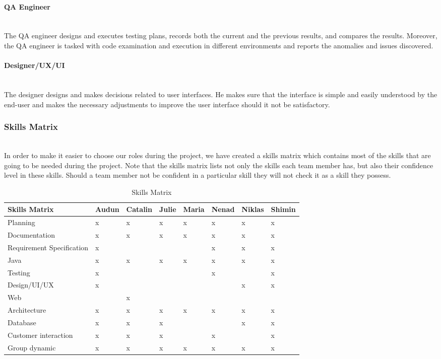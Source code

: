 \documentclass[../document.tex]{subfiles}
\begin{document}
\paragraph{QA Engineer} \ \\
The QA engineer designs and executes testing plans, records both the current and the previous results, and compares the results. Moreover, the QA engineer is tasked with code examination and execution in different environments and reports the anomalies and issues discovered. 

\paragraph{Designer/UX/UI} \ \\
The designer designs and makes decisions related to user interfaces. He makes sure that the interface is simple and easily understood by the end-user and makes the necessary adjustments to improve the user interface should it not be satisfactory.

\subsubsection{Skills Matrix} \ \\
In order to make it easier to choose our roles during the project, we have created a skills matrix which contains most of the skills that are going to be needed during the project. Note that the skills matrix lists not only the skills each team member has, but also their confidence level in these skills. Should a team member not be confident in a particular skill they will not check it as a skill they possess.

\begin{table}[H]
\caption{Skills Matrix}
\begin{tabularx}{\textwidth}{|L{2.2cm}|X|X|L{.7cm}|X|X|X|X|}
\hline
Skills Matrix
&Audun
&Catalin
&Julie
&Maria
&Nenad
&Niklas
&Shimin
\\ \hline Planning
&x
&x
&x
&x
&x
&x
&x
\\ \hline Documentation
&x
&x
&x
&x
&x
&x
&x
\\ \hline Requirement Specification
&x
&
&
&
&x
&x
&x
\\ \hline Java
&x
&x
&x
&x
&x
&x
&x
\\ \hline Testing
&x
&
&
&
&x
&
&x
\\ \hline Design/UI/UX
&x
&
&
&
&
&x
&x
\\ \hline Web
&
&x
&
&
&
&
&
\\ \hline Architecture
&x
&x
&x
&x
&x
&x
&x
\\ \hline Database
&x
&x
&x
&
&
&x
&x
\\ \hline Customer interaction
&x
&x
&x
&
&x
&
&x
\\ \hline Group dynamic
&x
&x
&x
&x
&x
&x
&x
\\ \hline
\end{tabularx}
\end{table}
\end{document}

